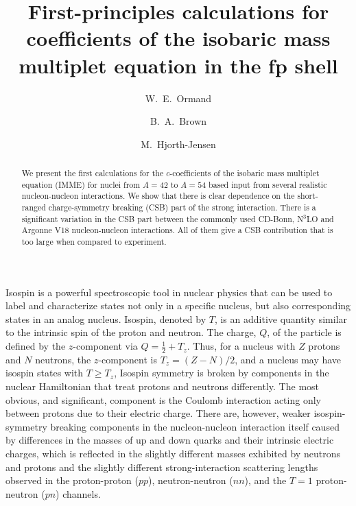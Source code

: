 \documentclass[
10pt,
showpacs,preprintnumbers,footinbib,
amsmath,amssymb,
aps,
prl,twocolumn,groupedaddress,superscriptaddress,
showkeys
]{revtex4-1}
\begin{document}
\title{First-principles calculations for coefficients of the isobaric
mass multiplet equation in the fp shell}


\author{W.~E.~Ormand}
\author{B.~A.~Brown} 
\author{M.~Hjorth-Jensen}

\begin{abstract}
We present the first calculations for the $c$-coefficients of the isobaric
mass multiplet equation (IMME)
for nuclei from $A=42$ to $A=54$ based input from several realistic nucleon-nucleon interactions.
We show that there is clear dependence on the short-ranged charge-symmetry
breaking (CSB) part of the strong interaction. There is a significant
variation in the CSB part between the commonly
used CD-Bonn, N$^3$LO and Argonne V18 nucleon-nucleon
interactions. All of them give a CSB contribution that is too large when 
compared to experiment.
\end{abstract}

\pacs{}


\maketitle

Isospin is a powerful spectroscopic tool in nuclear physics that can be used to label and characterize states not only in a specific nucleus, but also corresponding states in an analog nucleus. Isospin, denoted by $T$, is an additive quantity similar to the intrinsic spin of the proton and neutron. The charge, $Q$, of the particle is defined by the $z$-component via $Q=\frac{1}{2} + T_z$. Thus, for a nucleus with $Z$ protons and $N$ neutrons, the $z$-component is $T_z=(Z-N)/2$, and a nucleus may have isospin states with $T \ge T_z$,
Isospin symmetry is broken by components in the nuclear Hamiltonian that treat protons and neutrons differently. The most obvious, and significant, component is the Coulomb interaction acting only between protons due to their electric charge. There are, however, weaker isospin-symmetry breaking components in the nucleon-nucleon interaction itself caused by differences in the masses of up and down quarks and their intrinsic electric charges, which is reflected in the slightly different masses exhibited by neutrons and protons \cite{miller2006} and the slightly different strong-interaction scattering lengths observed in the proton-proton ($pp$), neutron-neutron ($nn$), and the $T=1$ proton-neutron ($pn$) channels. 
\end{document}
